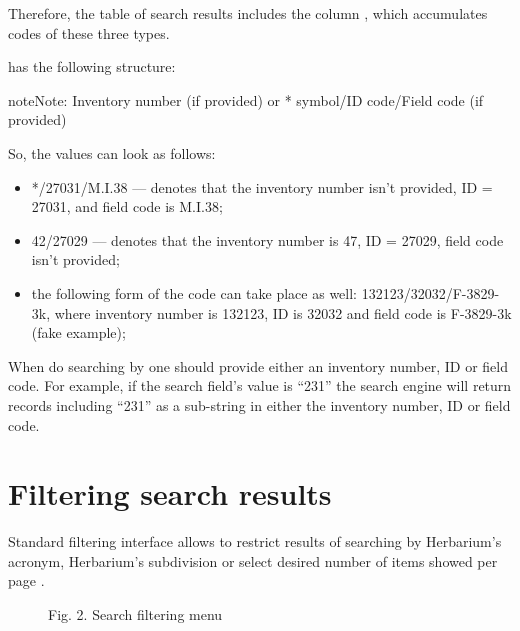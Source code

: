 \documentclass[letterpaper,10pt,english]{sphinxmanual}
\begin{document}
Therefore, the table of search results includes the column , which accumulates
codes of these three types.

 has the following structure:

\begin{sphinxadmonition}{note}{Note:}
Inventory number (if provided) or * symbol/ID code/Field code (if provided)
\end{sphinxadmonition}

So, the  values can look as follows:
\begin{itemize}
\item {} 
*/27031/M.I.38 — denotes that the inventory number isn’t provided, ID = 27031, and field code is M.I.38;

\item {} 
42/27029 — denotes that the inventory number is 47,  ID = 27029,  field code isn’t provided;

\item {} 
the following form of the code can take place as well: 132123/32032/F-3829-3k, where inventory number is 132123, ID is 32032 and
field code is F-3829-3k (fake example);

\end{itemize}

When do searching by  one should
provide either an inventory number, ID or field code. For example, if
the search field’s value is “231” the search engine will
return records including “231” as a sub-string
in either the inventory number, ID or field code.


\section{Filtering search results}
\label{\detokenize{search_basics:filtering-search-results}}
Standard filtering interface allows to restrict
results of searching by Herbarium’s acronym, Herbarium’s subdivision
or select desired number of items showed per
page {\hyperref[\detokenize{search_basics:fig2}]{}}.

\ignorespaces 
\begin{figure}[htbp]
\centering
\capstart

\noindent{}
\caption{Fig. 2. Search filtering menu}\label{\detokenize{search_basics:fig2}}\label{\detokenize{search_basics:id2}}\end{figure}
\end{document}

